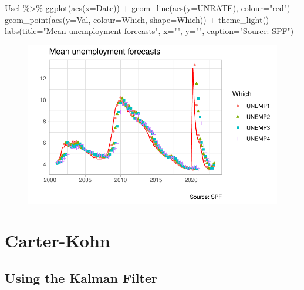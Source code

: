 \documentclass[
  letterpaper,
]{book}
\newenvironment{Shaded}{\begin{snugshade}}{\end{snugshade}}
\newcommand{\AttributeTok}[1]{\textcolor[rgb]{0.40,0.45,0.13}{#1}}
\newcommand{\FunctionTok}[1]{\textcolor[rgb]{0.28,0.35,0.67}{#1}}
\newcommand{\NormalTok}[1]{\textcolor[rgb]{0.00,0.23,0.31}{#1}}
\newcommand{\SpecialCharTok}[1]{\textcolor[rgb]{0.37,0.37,0.37}{#1}}
\newcommand{\StringTok}[1]{\textcolor[rgb]{0.13,0.47,0.30}{#1}}
\begin{document}
\begin{Shaded}
\begin{Highlighting}[]
\NormalTok{Usel }\SpecialCharTok{\%\textgreater{}\%} 
  \FunctionTok{ggplot}\NormalTok{(}\FunctionTok{aes}\NormalTok{(}\AttributeTok{x=}\NormalTok{Date)) }\SpecialCharTok{+} 
  \FunctionTok{geom\_line}\NormalTok{(}\FunctionTok{aes}\NormalTok{(}\AttributeTok{y=}\NormalTok{UNRATE), }\AttributeTok{colour=}\StringTok{"red"}\NormalTok{) }\SpecialCharTok{+} 
  \FunctionTok{geom\_point}\NormalTok{(}\FunctionTok{aes}\NormalTok{(}\AttributeTok{y=}\NormalTok{Val, }\AttributeTok{colour=}\NormalTok{Which, }\AttributeTok{shape=}\NormalTok{Which)) }\SpecialCharTok{+}
  \FunctionTok{theme\_light}\NormalTok{() }\SpecialCharTok{+} 
  \FunctionTok{labs}\NormalTok{(}\AttributeTok{title=}\StringTok{"Mean unemployment forecasts"}\NormalTok{, }\AttributeTok{x=}\StringTok{""}\NormalTok{, }\AttributeTok{y=}\StringTok{""}\NormalTok{, }\AttributeTok{caption=}\StringTok{"Source: SPF"}\NormalTok{)}
\end{Highlighting}
\end{Shaded}

\begin{figure}[H]

{\centering \includegraphics{QR_files/figure-pdf/unnamed-chunk-2-1.pdf}

}

\end{figure}

\hypertarget{carter-kohn}{%
\chapter{Carter-Kohn}\label{carter-kohn}}

\hypertarget{using-the-kalman-filter}{%
\section{Using the Kalman Filter}\label{using-the-kalman-filter}}
\end{document}
